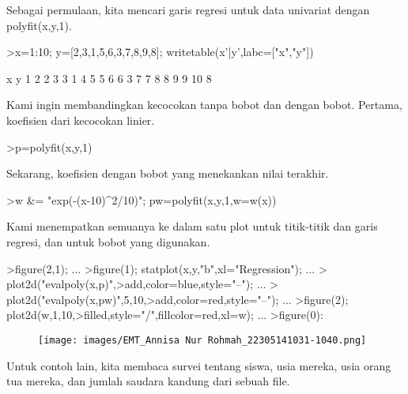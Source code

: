\documentclass[a4paper,10pt]{article}
\begin{document}
\begin{eulernotebook}
\begin{eulercomment}
\begin{eulercomment}
\begin{eulercomment}
\begin{eulercomment}
\begin{eulercomment}
Sebagai permulaan, kita mencari garis regresi untuk data univariat
dengan polyfit(x,y,1).
\end{eulercomment}
\begin{eulerprompt}
>x=1:10; y=[2,3,1,5,6,3,7,8,9,8]; writetable(x'|y',labc=["x","y"])
\end{eulerprompt}
\begin{euleroutput}
           x         y
           1         2
           2         3
           3         1
           4         5
           5         6
           6         3
           7         7
           8         8
           9         9
          10         8
\end{euleroutput}
\begin{eulercomment}
Kami ingin membandingkan kecocokan tanpa bobot dan dengan bobot.
Pertama, koefisien dari kecocokan linier.
\end{eulercomment}
\begin{eulerprompt}
>p=polyfit(x,y,1)
\end{eulerprompt}
\begin{euleroutput}
  [0.733333,  0.812121]
\end{euleroutput}
\begin{eulercomment}
Sekarang, koefisien dengan bobot yang menekankan nilai terakhir.
\end{eulercomment}
\begin{eulerprompt}
>w &= "exp(-(x-10)^2/10)"; pw=polyfit(x,y,1,w=w(x))
\end{eulerprompt}
\begin{euleroutput}
  [4.71566,  0.38319]
\end{euleroutput}
\begin{eulercomment}
Kami menempatkan semuanya ke dalam satu plot untuk titik-titik dan
garis regresi, dan untuk bobot yang digunakan.
\end{eulercomment}
\begin{eulerprompt}
>figure(2,1);  ...
>figure(1); statplot(x,y,"b",xl="Regression"); ...
>  plot2d("evalpoly(x,p)",>add,color=blue,style="--"); ...
>  plot2d("evalpoly(x,pw)",5,10,>add,color=red,style="--"); ...
>figure(2); plot2d(w,1,10,>filled,style="/",fillcolor=red,xl=w); ...
>figure(0):
\end{eulerprompt}
\begin{figure}[h]
    \centering
    \texttt{[image: images/EMT\_Annisa Nur Rohmah\_22305141031-1040.png]}
\end{figure}
\begin{eulercomment}
Untuk contoh lain, kita membaca survei tentang siswa, usia mereka,
usia orang tua mereka, dan jumlah saudara kandung dari sebuah file.


\end{eulercomment}
\end{eulercomment}
\end{eulercomment}
\end{eulercomment}
\end{eulercomment}
\end{eulernotebook}
\end{document}
